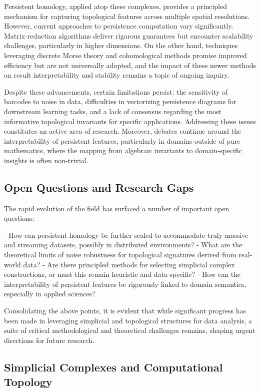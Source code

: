 \documentclass[sigconf]{acmart}
\begin{document}
Persistent homology, applied atop these complexes, provides a principled mechanism for capturing topological features across multiple spatial resolutions. However, current approaches to persistence computation vary significantly. Matrix-reduction algorithms deliver rigorous guarantees but encounter scalability challenges, particularly in higher dimensions. On the other hand, techniques leveraging discrete Morse theory and cohomological methods promise improved efficiency but are not universally adopted, and the impact of these newer methods on result interpretability and stability remains a topic of ongoing inquiry.

Despite these advancements, certain limitations persist: the sensitivity of barcodes to noise in data, difficulties in vectorizing persistence diagrams for downstream learning tasks, and a lack of consensus regarding the most informative topological invariants for specific applications. Addressing these issues constitutes an active area of research. Moreover, debates continue around the interpretability of persistent features, particularly in domains outside of pure mathematics, where the mapping from algebraic invariants to domain-specific insights is often non-trivial.

\subsection{Open Questions and Research Gaps}

The rapid evolution of the field has surfaced a number of important open questions:
 
- How can persistent homology be further scaled to accommodate truly massive and streaming datasets, possibly in distributed environments?
- What are the theoretical limits of noise robustness for topological signatures derived from real-world data?
- Are there principled methods for selecting simplicial complex constructions, or must this remain heuristic and data-specific?
- How can the interpretability of persistent features be rigorously linked to domain semantics, especially in applied sciences?

Consolidating the above points, it is evident that while significant progress has been made in leveraging simplicial and topological structures for data analysis, a suite of critical methodological and theoretical challenges remains, shaping urgent directions for future research.

\subsection{Simplicial Complexes and Computational Topology}
\end{document}
